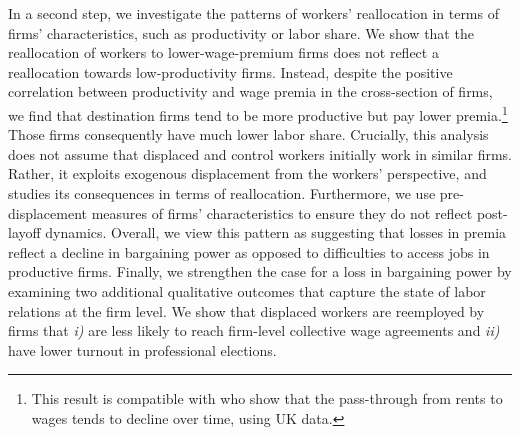 
In a second step, we investigate the patterns of workers' reallocation in terms of firms' characteristics, such as productivity or labor share. We show that the reallocation of workers to lower-wage-premium firms does not reflect a reallocation towards low-productivity firms. Instead, despite the positive correlation between productivity and wage premia in the cross-section of firms, we find that destination firms tend to be more productive but pay lower premia.\footnote{This result is compatible with \cite{bell_bukowski_machin_2024} who show that the pass-through from rents to wages tends to decline over time, using UK data.} Those firms consequently have much lower labor share. Crucially, this analysis does not assume that displaced and control workers initially work in similar firms. Rather, it exploits exogenous displacement from the workers' perspective, and studies its consequences in terms of reallocation. Furthermore, we use pre-displacement measures of firms' characteristics to ensure they do not reflect post-layoff dynamics. Overall, we view this pattern as suggesting that losses in premia reflect a decline in bargaining power as opposed to difficulties to access jobs in productive firms. Finally, we strengthen the case for a loss in bargaining power by examining two additional qualitative outcomes that capture the state of labor relations at the firm level. We show that displaced workers are reemployed by firms that \textit{i)} are less likely to reach firm-level collective wage agreements and \textit{ii)} have lower turnout in professional elections. 

